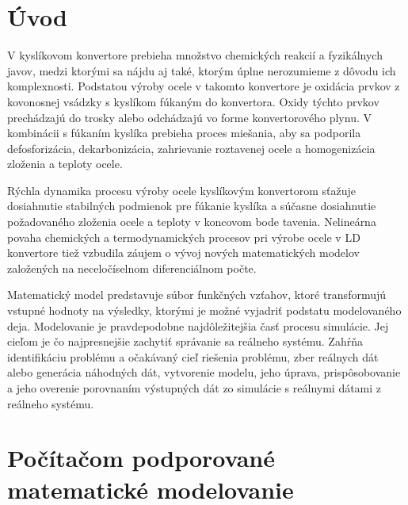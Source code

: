 \documentclass[]{tukediphc}
\begin{document}
\renewcommand\theHfigure{\theHsection.\arabic{figure}}
\renewcommand\theHtable{\theHsection.\arabic{table}}


\prvastrana


\thispagestyle{empty}
\tableofcontents
\newpage
%
%


\setcounter{page}{1}
\setcounter{equation}{0}
\setcounter{figure}{0}
\setcounter{table}{0}

\section{Úvod}

V kyslíkovom konvertore prebieha množstvo chemických reakcií a fyzikálnych javov, medzi ktorými sa nájdu aj také, ktorým úplne nerozumieme z dôvodu ich komplexnosti. Podstatou výroby ocele v takomto konvertore je oxidácia prvkov z kovonosnej vsádzky s kyslíkom fúkaným do konvertora. Oxidy týchto prvkov prechádzajú do trosky alebo odchádzajú vo forme konvertorového plynu. V kombinácii s fúkaním kyslíka prebieha proces miešania, aby sa podporila defosforizácia, dekarbonizácia, zahrievanie roztavenej ocele a homogenizácia zloženia a teploty ocele.

Rýchla dynamika procesu výroby ocele kyslíkovým konvertorom sťažuje dosiahnutie stabilných podmienok pre fúkanie kyslíka a súčasne dosiahnutie požadovaného zloženia ocele a teploty v koncovom bode tavenia. Nelineárna povaha chemických a termodynamických procesov pri výrobe ocele v LD konvertore tiež vzbudila záujem o vývoj nových matematických modelov založených na neceločíselnom diferenciálnom počte.

Matematický model predstavuje súbor funkčných vzťahov, ktoré transformujú vstupné hodnoty na výsledky, ktorými je možné vyjadriť podstatu modelovaného deja. Modelovanie je pravdepodobne najdôležitejšia časť procesu simulácie. Jej cieľom je čo najpresnejšie zachytiť správanie sa reálneho systému. Zahŕňa identifikáciu problému a očakávaný cieľ riešenia problému, zber reálnych dát alebo generácia náhodných dát, vytvorenie modelu, jeho úprava, prispôsobovanie a jeho overenie porovnaním výstupných dát zo simulácie s reálnymi dátami z reálneho systému.

\section{Počítačom podporované matematické modelovanie}
\end{document}
